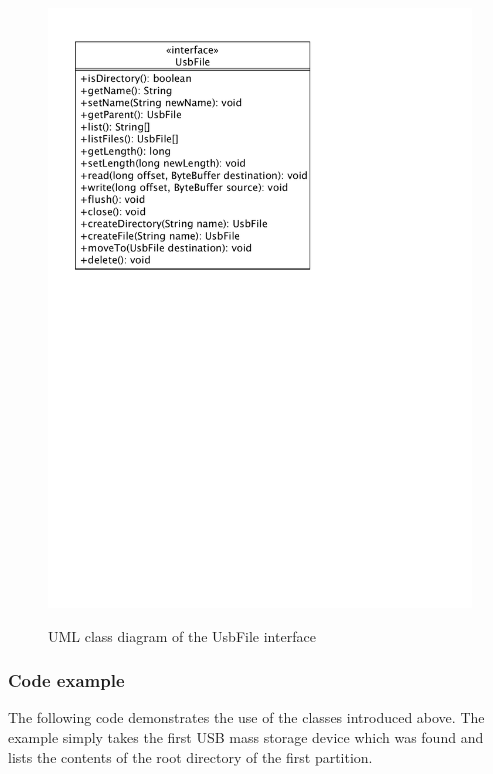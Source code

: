 \begin{figure}[h!]
\caption{UML class diagram of the UsbFile interface}
\centering
\includegraphics[scale=0.85]{figures/usb_file}
\label{figure:usb_file}
\end{figure}

\subsubsection{Code example}

The following code demonstrates the use of the classes introduced above. The example simply takes the first USB mass storage device which was found and lists the contents of the root directory of the first partition.

